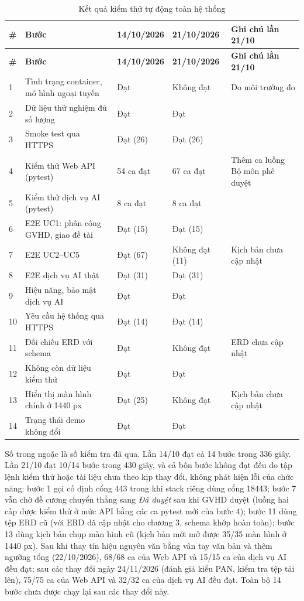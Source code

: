 \documentclass[../main.tex]{subfiles}
\begin{document}
{\renewcommand{\arraystretch}{1.15}
\begin{longtable}{|p{0.6cm}|p{5.3cm}|p{2.1cm}|p{2.1cm}|p{3.6cm}|}
\caption{Kết quả kiểm thử tự động toàn hệ thống}\label{tab:c4-verify-all}\\
\hline
\textbf{\#} & \textbf{Bước} & \textbf{14/10/2026} & \textbf{21/10/2026} & \textbf{Ghi chú lần 21/10} \\
\hline
\endfirsthead
\hline
\textbf{\#} & \textbf{Bước} & \textbf{14/10/2026} & \textbf{21/10/2026} & \textbf{Ghi chú lần 21/10} \\
\hline
\endhead
1 & Tình trạng container, mô hình ngoại tuyến & Đạt & Không đạt & Do môi trường đo \\
\hline
2 & Dữ liệu thử nghiệm đủ số lượng & Đạt & Đạt & \\
\hline
3 & Smoke test qua HTTPS & Đạt (26) & Đạt (26) & \\
\hline
4 & Kiểm thử Web API (pytest) & 54 ca đạt & 67 ca đạt & Thêm ca luồng Bộ môn phê duyệt \\
\hline
5 & Kiểm thử dịch vụ AI (pytest) & 8 ca đạt & 8 ca đạt & \\
\hline
6 & E2E UC1: phân công GVHD, giao đề tài & Đạt (15) & Đạt (15) & \\
\hline
7 & E2E UC2--UC5 & Đạt (67) & Không đạt (11) & Kịch bản chưa cập nhật \\
\hline
8 & E2E dịch vụ AI thật & Đạt (31) & Đạt (31) & \\
\hline
9 & Hiệu năng, bảo mật dịch vụ AI & Đạt & Đạt & \\
\hline
10 & Yêu cầu hệ thống qua HTTPS & Đạt (14) & Đạt (14) & \\
\hline
11 & Đối chiếu ERD với schema & Đạt & Không đạt & ERD chưa cập nhật \\
\hline
12 & Không còn dữ liệu kiểm thử & Đạt & Đạt & \\
\hline
13 & Hiển thị màn hình chính ở 1440 px & Đạt (25) & Không đạt & Kịch bản chưa cập nhật \\
\hline
14 & Trạng thái demo không đổi & Đạt & Đạt & \\
\hline
\end{longtable}
}

\noindent Số trong ngoặc là số kiểm tra đã qua. Lần 14/10 đạt cả 14 bước trong 336 giây. Lần 21/10 đạt 10/14 bước trong 430 giây, và cả bốn bước không đạt đều do tập lệnh kiểm thử hoặc tài liệu chưa theo kịp thay đổi, không phát hiện lỗi của chức năng: bước 1 gọi cố định cổng 443 trong khi stack riêng dùng cổng 18443; bước 7 vẫn chờ đề cương chuyển thẳng sang \textit{Đã duyệt} sau khi GVHD duyệt (luồng hai cấp được kiểm thử ở mức API bằng các ca pytest mới của bước 4); bước 11 dùng tệp ERD cũ (với ERD đã cập nhật cho chương 3, schema khớp hoàn toàn); bước 13 dùng kịch bản chụp màn hình cũ (kịch bản mới mở được 35/35 màn hình ở 1440 px). Sau khi thay tín hiệu nguyên văn bằng vân tay văn bản và thêm ngưỡng tổng (22/10/2026), 68/68 ca của Web API và 15/15 ca của dịch vụ AI đều đạt; sau các thay đổi ngày 24/11/2026 (đánh giá kiểu PAN, kiểm tra tệp tải lên), 75/75 ca của Web API và 32/32 ca của dịch vụ AI đều đạt. Toàn bộ 14 bước chưa được chạy lại sau các thay đổi này.
\end{document}
